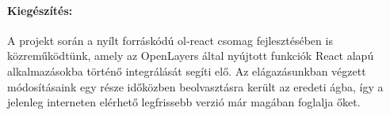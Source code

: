 \paragraph{Kiegészítés:}
A projekt során a nyílt forráskódú ol-react csomag fejlesztésében is
közreműködtünk, amely az OpenLayers által nyújtott funkciók React alapú
alkalmazásokba történő integrálását segíti elő. Az elágazásunkban végzett
módosításaink egy része időközben beolvasztásra került az eredeti ágba, így a
jelenleg interneten elérhető legfrissebb verzió már magában foglalja őket.
